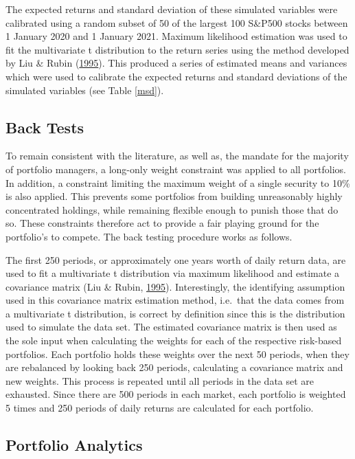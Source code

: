 \documentclass[11pt,preprint, authoryear]{elsarticle}
\numberwithin{equation}{section}
\numberwithin{figure}{section}
\numberwithin{table}{section}
\begin{document}
The expected returns and standard deviation of these simulated variables
were calibrated using a random subset of 50 of the largest 100 S\&P500
stocks between 1 January 2020 and 1 January 2021. Maximum likelihood
estimation was used to fit the multivariate t distribution to the return
series using the method developed by Liu \& Rubin
(\protect\hyperlink{ref-liu1995}{1995}). This produced a series of
estimated means and variances which were used to calibrate the expected
returns and standard deviations of the simulated variables (see Table
\ref{msd}).

\hypertarget{back-tests}{%
\subsection{\texorpdfstring{Back Tests
\label{backtest}}{Back Tests }}\label{back-tests}}

To remain consistent with the literature, as well as, the mandate for
the majority of portfolio managers, a long-only weight constraint was
applied to all portfolios. In addition, a constraint limiting the
maximum weight of a single security to 10\% is also applied. This
prevents some portfolios from building unreasonably highly concentrated
holdings, while remaining flexible enough to punish those that do so.
These constraints therefore act to provide a fair playing ground for the
portfolio's to compete. The back testing procedure works as follows.

The first 250 periods, or approximately one years worth of daily return
data, are used to fit a multivariate t distribution via maximum
likelihood and estimate a covariance matrix (Liu \& Rubin,
\protect\hyperlink{ref-liu1995}{1995}). Interestingly, the identifying
assumption used in this covariance matrix estimation method, i.e.~that
the data comes from a multivariate t distribution, is correct by
definition since this is the distribution used to simulate the data set.
The estimated covariance matrix is then used as the sole input when
calculating the weights for each of the respective risk-based
portfolios. Each portfolio holds these weights over the next 50 periods,
when they are rebalanced by looking back 250 periods, calculating a
covariance matrix and new weights. This process is repeated until all
periods in the data set are exhausted. Since there are 500 periods in
each market, each portfolio is weighted 5 times and 250 periods of daily
returns are calculated for each portfolio.

\hypertarget{portfolio-analytics}{%
\subsection{\texorpdfstring{Portfolio Analytics
\label{portmet}}{Portfolio Analytics }}\label{portfolio-analytics}}
\end{document}
